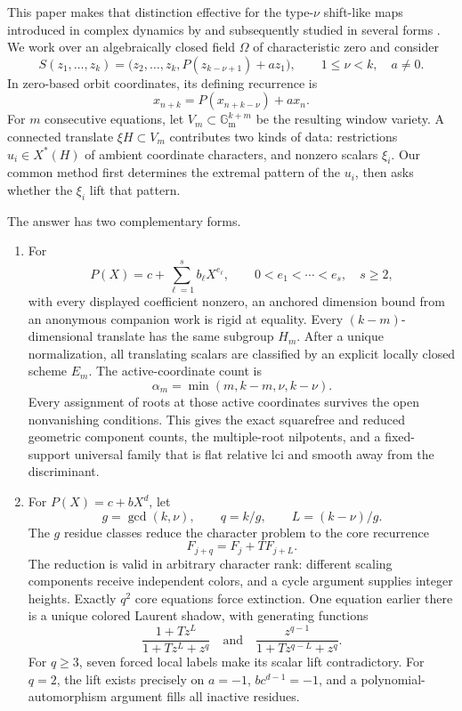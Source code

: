 \documentclass[11pt]{article}
\newcommand{\Gm}{\mathbb{G}_{\mathrm m}}
\newcommand{\Om}{\Omega}
\theoremstyle{remark}
\numberwithin{equation}{section}
\begin{document}
This paper makes that distinction effective for the type-\(\nu\) shift-like maps introduced in complex dynamics by \citet{bedfordpambuccian1998dynamics} and subsequently studied in several forms \citep{bera2019polynomial,beraverma2018aspects,kaur2026remarks}.  We work over an algebraically closed field \(\Om\) of characteristic zero and consider
\[
 S(z_1,\ldots,z_k)
   =\bigl(z_2,\ldots,z_k,P(z_{k-\nu+1})+az_1\bigr),
 \qquad 1\leq \nu<k,\quad a\neq0.
\]
In zero-based orbit coordinates, its defining recurrence is
\begin{equation}\label{eq:intro-recurrence}
 x_{n+k}=P(x_{n+k-\nu})+a x_n .
\end{equation}
For \(m\) consecutive equations, let \(V_m\subset\Gm^{k+m}\) be the resulting window variety.  A connected translate \(\xi H\subset V_m\) contributes two kinds of data: restrictions \(u_i\in X^\ast(H)\) of ambient coordinate characters, and nonzero scalars \(\xi_i\).  Our common method first determines the extremal pattern of the \(u_i\), then asks whether the \(\xi_i\) lift that pattern.

The answer has two complementary forms.

\begin{enumerate}
\item For
\[
 P(X)=c+\sum_{\ell=1}^{s}b_\ell X^{e_\ell},
 \qquad 0<e_1<\cdots<e_s,\quad s\geq2,
\]
with every displayed coefficient nonzero, an anchored dimension bound from an anonymous companion work \citep{companionDecay} is rigid at equality.  Every \((k-m)\)-dimensional translate has the same subgroup \(H_m\).  After a unique normalization, all translating scalars are classified by an explicit locally closed scheme \(E_m\).  The active-coordinate count is
\[
 \alpha_m=\min(m,k-m,\nu,k-\nu).
\]
Every assignment of roots at those active coordinates survives the open nonvanishing conditions.  This gives the exact squarefree and reduced geometric component counts, the multiple-root nilpotents, and a fixed-support universal family that is flat relative lci and smooth away from the discriminant.

\item For \(P(X)=c+bX^d\), let
\[
 g=\gcd(k,\nu),\qquad q=k/g,\qquad L=(k-\nu)/g.
\]
The \(g\) residue classes reduce the character problem to the core recurrence
\[
 F_{j+q}=F_j+T F_{j+L}.
\]
The reduction is valid in arbitrary character rank: different scaling components receive independent colors, and a cycle argument supplies integer heights.  Exactly \(q^2\) core equations force extinction.  One equation earlier there is a unique colored Laurent shadow, with generating functions
\[
 \frac{1+Tz^L}{1+Tz^L+z^q}
 \quad\text{and}\quad
 \frac{z^{q-1}}{1+Tz^{q-L}+z^q}.
\]
For \(q\geq3\), seven forced local labels make its scalar lift contradictory.  For \(q=2\), the lift exists precisely on
\(a=-1\), \(bc^{d-1}=-1\), and a polynomial-automorphism argument fills all inactive residues.
\end{enumerate}
\end{document}
